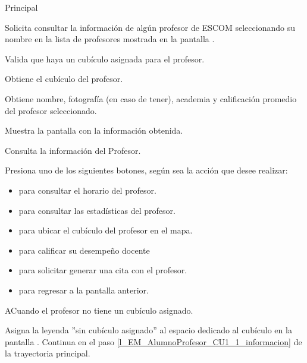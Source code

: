\begin{UCtrayectoria}{Principal}

	\UCpaso [\UCactor] Solicita consultar la información de algún profesor de ESCOM seleccionando su nombre en la lista de profesores mostrada en la pantalla .

	\UCpaso Valida que haya un cubículo asignada para el profesor.

	\UCpaso Obtiene el cubículo del profesor. 

	\UCpaso Obtiene nombre, fotografía (en caso de tener), academia y calificación promedio del profesor seleccionado. \label{l_EM_AlumnoProfesor_CU1_1_informacion}

	\UCpaso Muestra la pantalla  con la información obtenida.

	\UCpaso[\UCactor] Consulta la información del Profesor.

	\UCpaso [\UCactor] Presiona uno de los siguientes botones, según sea la acción que desee realizar: 
	\begin{itemize}
		\item {} para consultar el horario del profesor.
		\item {} para consultar las estadísticas del profesor.
		\item {} para ubicar el cubículo del profesor en el mapa.
		\item {} para calificar su desempeño docente
		\item {} para solicitar generar una cita con el profesor.
		\item {} para regresar a la pantalla anterior.  
	\end{itemize}

\end{UCtrayectoria}

\begin{UCtrayectoriaA}{A}{Cuando el profesor no tiene un cubículo asignado.}

	\UCpaso	Asigna la leyenda ''sin cubículo asignado'' al espacio dedicado al cubículo en la pantalla .
	\UCpaso Continua en el paso \ref{l_EM_AlumnoProfesor_CU1_1_informacion} de la trayectoria principal.

\end{UCtrayectoriaA}



